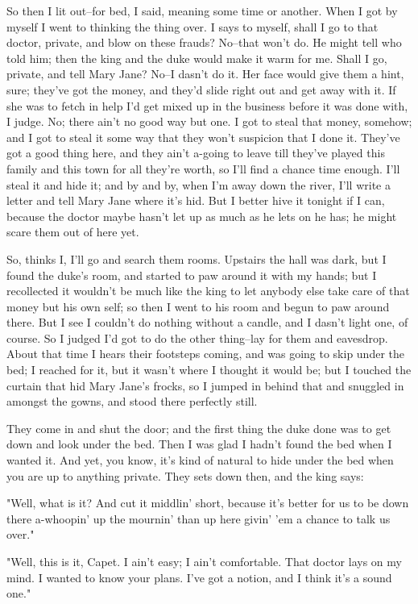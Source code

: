 So then I lit out--for bed, I said, meaning some time or another.  When I
got by myself I went to thinking the thing over.  I says to myself, shall
I go to that doctor, private, and blow on these frauds?  No--that won't
do. He might tell who told him; then the king and the duke would make it
warm for me.  Shall I go, private, and tell Mary Jane?  No--I dasn't do
it. Her face would give them a hint, sure; they've got the money, and
they'd slide right out and get away with it.  If she was to fetch in help
I'd get mixed up in the business before it was done with, I judge.  No;
there ain't no good way but one.  I got to steal that money, somehow; and
I got to steal it some way that they won't suspicion that I done it.
They've got a good thing here, and they ain't a-going to leave till
they've played this family and this town for all they're worth, so I'll
find a chance time enough. I'll steal it and hide it; and by and by, when
I'm away down the river, I'll write a letter and tell Mary Jane where
it's hid.  But I better hive it tonight if I can, because the doctor
maybe hasn't let up as much as he lets on he has; he might scare them out
of here yet.

So, thinks I, I'll go and search them rooms.  Upstairs the hall was dark,
but I found the duke's room, and started to paw around it with my hands;
but I recollected it wouldn't be much like the king to let anybody else
take care of that money but his own self; so then I went to his room and
begun to paw around there.  But I see I couldn't do nothing without a
candle, and I dasn't light one, of course.  So I judged I'd got to do the
other thing--lay for them and eavesdrop.  About that time I hears their
footsteps coming, and was going to skip under the bed; I reached for it,
but it wasn't where I thought it would be; but I touched the curtain that
hid Mary Jane's frocks, so I jumped in behind that and snuggled in
amongst the gowns, and stood there perfectly still.

They come in and shut the door; and the first thing the duke done was to
get down and look under the bed.  Then I was glad I hadn't found the bed
when I wanted it.  And yet, you know, it's kind of natural to hide under
the bed when you are up to anything private.  They sets down then, and
the king says:

"Well, what is it?  And cut it middlin' short, because it's better for us
to be down there a-whoopin' up the mournin' than up here givin' 'em a
chance to talk us over."

"Well, this is it, Capet.  I ain't easy; I ain't comfortable.  That
doctor lays on my mind.  I wanted to know your plans.  I've got a notion,
and I think it's a sound one."


